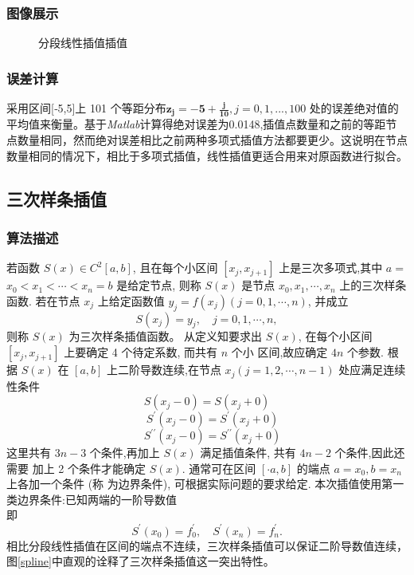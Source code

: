 \documentclass{ctexart}%
\begin{document}
\subsubsection{图像展示}
\begin{figure}[H]
    \centering
    
    \caption{分段线性插值插值}
    \label{linear}
\end{figure}

\subsubsection{误差计算}
采用区间[‐5,5]上 101 个等距分布$\mathbf{z_j=-5+\frac{j}{10}},j=0,1,...,100$
处的误差绝对值的平均值来衡量。基于\textit{Matlab}计算得绝对误差为0.0148,插值点数量和之前的等距节点数量相同，然而绝对误差相比之前两种多项式插值方法都要更少。这说明在节点数量相同的情况下，相比于多项式插值，线性插值更适合用来对原函数进行拟合。




\subsection{三次样条插值}
\subsubsection{算法描述}

若函数 $S(x) \in C^{2}[a, b]$, 且在每个小区间 $\left[x_{j}, x_{j+1}\right]$ 上是三次多项式,其中 $a=$ $x_{0}<x_{1}<\cdots<x_{n}=b$ 是给定节点, 则称 $S(x)$ 是节点 $x_{0}, x_{1}, \cdots, x_{n}$ 上的三次样条函数. 若在节点 $x_{j}$ 上给定函数值 $y_{j}=f\left(x_{j}\right)(j=0,1, \cdots, n)$, 并成立
$$
S\left(x_{j}\right)=y_{j}, \quad j=0,1, \cdots, n,
$$
则称 $S(x)$ 为三次样条插值函数。
从定义知要求出 $S(x)$, 在每个小区间 $\left[x_{j}, x_{j+1}\right]$ 上要确定 4 个待定系数, 而共有 $n$ 个小 区间,故应确定 $4 n$ 个参数. 根据 $S(x)$ 在 $[a, b]$ 上二阶导数连续,在节点 $x_{j}(j=1,2, \cdots, n-1)$ 处应满足连续性条件
$$
S\left(x_{j}-0\right)=S\left(x_{j}+0\right)$$ $$\quad S^{\prime}\left(x_{j}-0\right)=S^{\prime}\left(x_{j}+0\right)$$ $$\quad S^{\prime \prime}\left(x_{j}-0\right)=S^{\prime \prime}\left(x_{j}+0\right) 
$$ 这里共有 $3 n-3$ 个条件,再加上 $S(x)$ 满足插值条件, 共有 $4 n-2$ 个条件,因此还需要 加上 2 个条件才能确定 $S(x)$. 通常可在区间 $[\cdot a, b]$ 的端点 $a=x_{0}, b=x_{n}$ 上各加一个条件 (称 为边界条件), 可根据实际问题的要求给定. 本次插值使用第一类边界条件:已知两端的一阶导数值\\
即
$$
S^{\prime}\left(x_{0}\right)=f_{0}^{\prime}, \quad S^{\prime}\left(x_{n}\right)=f_{n}^{\prime} .
$$
相比分段线性插值在区间的端点不连续，三次样条插值可以保证二阶导数值连续，图\ref{spline}中直观的诠释了三次样条插值这一突出特性。
\end{document}
